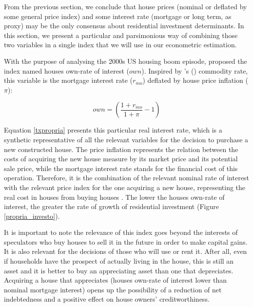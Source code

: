 \documentclass[12pt, a4paper]{article}
\begin{document}
From the previous section, we conclude that house prices (nominal or deflated by some general price index) and some interest rate (mortgage or long term, as proxy) may be the only consensus about residential investment determinants.
In this section, we present a particular and parsimonious way of combining those two variables  in a single index that we will use in our econometric estimation.


With the purpose of analysing the 2000s US housing boom episode, \textcite{teixeira_crescimento_2015}  proposed the index named houses own-rate of interest (\(own\)).
Inspired by \citeauthor*{sraffaDrHayekMoney1932}'s (\citeyear{sraffaDrHayekMoney1932}) commodity rate, this variable is the mortgage interest rate (\(r_{mo}\)) deflated by house price inflation (\(\pi\)):
\begin{latex}
\begin{equation}
\label{txpropria}
own =  \left(\frac{1+r_{mo}}{1+\pi} - 1\right)
\end{equation}
\end{latex}


Equation \ref{txpropria} presents this particular real interest rate, which is a synthetic representative of all the relevant variables for the decision to purchase a new constructed house.
The price inflation represents the relation between the costs of acquiring the new house measure by its market price and its potential sale price, while the mortgage interest rate stands for the financial cost of this operation.
Therefore, it is the combination of the relevant nominal rate of interest with the relevant price index for the one acquiring a new house, representing the real cost in houses from buying houses \parencite[p.~53]{teixeira_crescimento_2015}.
The lower the houses own-rate of interest, the greater the rate of growth of residential investment (Figure \ref{propria_investo}).


It is important to note the relevance of this index goes beyond the interests of speculators who buy houses to sell it in the future in order to make capital gains.
It is also relevant for the decisions of those who will use or rent it.
After all, even if households have the prospect of actually living in the house, this is still an asset and it is better to buy an appreciating asset  than one that depreciates.
Acquiring a house that appreciates (houses own-rate of interest lower than nominal mortgage interest) opens up the possibility of a reduction of net indebtedness and a positive effect on house owners’ creditworthiness.
\end{document}
